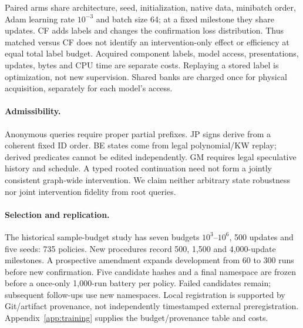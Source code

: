 \documentclass[10pt]{article}
\begin{document}
Paired arms share architecture, seed, initialization, native data, minibatch
order, Adam learning rate $10^{-3}$ and batch size 64; at a fixed milestone
they share updates. CF adds labels and changes the confirmation loss
distribution. Thus matched versus CF does not identify an intervention-only
effect or efficiency at equal total label budget. Acquired component labels,
model access, presentations, updates, bytes and CPU time are separate costs.
Replaying a stored label is optimization, not new supervision. Shared banks
are charged once for physical acquisition, separately for each model's access.

\paragraph{Admissibility.}
Anonymous queries require proper partial prefixes. JP signs derive from a
coherent fixed ID order. BE states come from legal polynomial/KW replay;
derived predicates cannot be edited independently. GM requires legal
speculative history and schedule. A typed rooted continuation need not form
a jointly consistent graph-wide intervention. We claim neither arbitrary
state robustness nor joint intervention fidelity from root queries.

\paragraph{Selection and replication.}
The historical sample-budget study has seven budgets $10^3$--$10^6$,
500 updates and five seeds: 735 policies. New procedures record 500, 1,500
and 4,000-update milestones. A prospective amendment expands development
from 60 to 300 runs before new confirmation. Five candidate hashes and a
final namespace are frozen before a once-only 1,000-run battery per policy.
Failed candidates remain; subsequent follow-ups use new namespaces. Local
registration is supported by Git/artifact provenance, not independently
timestamped external preregistration. Appendix~\ref{app:training} supplies
the budget/provenance table and costs.
\end{document}
